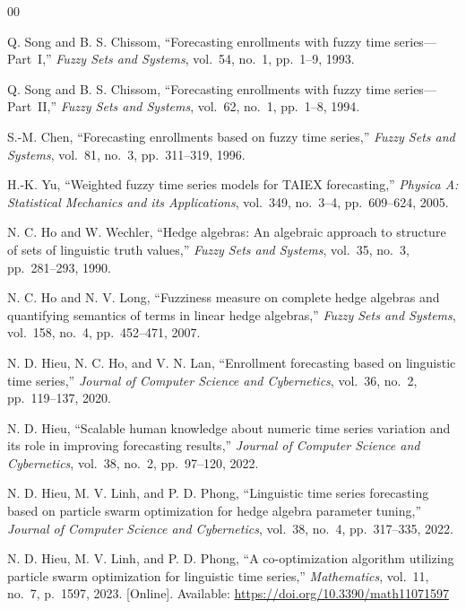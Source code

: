 \documentclass[conference]{IEEEtran}
\begin{document}
\begin{thebibliography}{00}

Q. Song and B. S. Chissom,
``Forecasting enrollments with fuzzy time series---Part~I,''
\textit{Fuzzy Sets and Systems}, vol.~54, no.~1, pp.~1--9, 1993.

Q. Song and B. S. Chissom,
``Forecasting enrollments with fuzzy time series---Part~II,''
\textit{Fuzzy Sets and Systems}, vol.~62, no.~1, pp.~1--8, 1994.

S.-M. Chen,
``Forecasting enrollments based on fuzzy time series,''
\textit{Fuzzy Sets and Systems}, vol.~81, no.~3, pp.~311--319, 1996.

H.-K. Yu,
``Weighted fuzzy time series models for TAIEX forecasting,''
\textit{Physica A: Statistical Mechanics and its Applications},
vol.~349, no.~3--4, pp.~609--624, 2005.

N. C. Ho and W. Wechler,
``Hedge algebras: An algebraic approach to structure of sets of
linguistic truth values,''
\textit{Fuzzy Sets and Systems}, vol.~35, no.~3, pp.~281--293, 1990.

N. C. Ho and N. V. Long,
``Fuzziness measure on complete hedge algebras and quantifying
semantics of terms in linear hedge algebras,''
\textit{Fuzzy Sets and Systems}, vol.~158, no.~4, pp.~452--471, 2007.

N. D. Hieu, N. C. Ho, and V. N. Lan,
``Enrollment forecasting based on linguistic time series,''
\textit{Journal of Computer Science and Cybernetics}, vol.~36, no.~2,
pp.~119--137, 2020.

N. D. Hieu,
``Scalable human knowledge about numeric time series variation and
its role in improving forecasting results,''
\textit{Journal of Computer Science and Cybernetics}, vol.~38, no.~2,
pp.~97--120, 2022.

N. D. Hieu, M. V. Linh, and P. D. Phong,
``Linguistic time series forecasting based on particle swarm
optimization for hedge algebra parameter tuning,''
\textit{Journal of Computer Science and Cybernetics}, vol.~38, no.~4,
pp.~317--335, 2022.

N. D. Hieu, M. V. Linh, and P. D. Phong,
``A co-optimization algorithm utilizing particle swarm optimization
for linguistic time series,''
\textit{Mathematics}, vol.~11, no.~7, p.~1597, 2023.
[Online]. Available: \url{https://doi.org/10.3390/math11071597}


\end{thebibliography}
\end{document}
